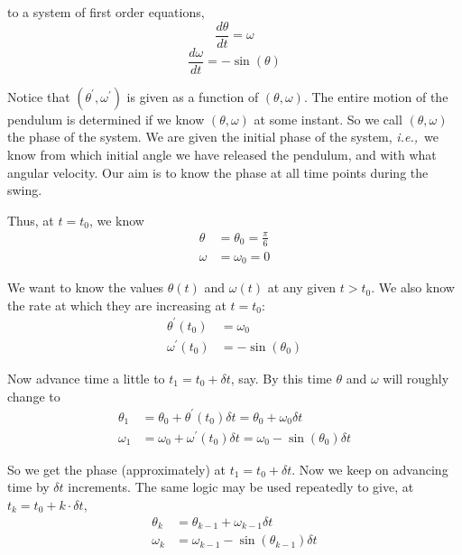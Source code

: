\documentclass[a4paper,11pt]{report}
\begin{document}
\begin{enumerate}
    to a system of first order equations,
    \begin{equation*}
    \frac{d \theta}{dt} = \omega
    \end{equation*}
    \begin{equation*}
    \frac{d \omega}{dt} = -\sin(\theta)
    \end{equation*}

    Notice that $(\theta^\prime, \omega^\prime)$ is given as a function of $(\theta,
    \omega)$. The entire motion of the pendulum is determined if we know $(\theta,
    \omega)$ at some instant. So we call $(\theta, \omega)$ the phase of the system. We
    are given the initial phase of the system, \textit{i.e.,}\ we know from which initial
    angle we have released the pendulum, and with what angular velocity. Our aim is to 
    know the phase at all time points during the swing.

    Thus, at $t = t_0$, we know
    \begin{equation*}
    \begin{aligned}
    \theta &= \theta_0 = \frac{\pi}{6} \\
    \omega &= \omega_0 = 0
    \end{aligned}
    \end{equation*}

    We want to know the values $\theta(t)$ and $\omega(t)$ at any given $t > t_0$. We 
    also know the rate at which they are increasing at $t = t_0$:
    \begin{equation*}
    \begin{aligned}
    \theta^{\prime}(t_0) &= \omega_0 \\
    \omega^{\prime}(t_0) &= - \sin(\theta_0)
    \end{aligned}
    \end{equation*}

    Now advance time a little to $t_1 = t_0 + \delta t$, say. By this time $\theta$ and
    $\omega$ will roughly change to
    \begin{equation*}
    \begin{aligned}
    \theta_1 &= \theta_0 + \theta^{\prime}(t_0) \delta t = \theta_0 + \omega_0 \delta t \\
    \omega_1 &= \omega_0 + \omega^{\prime}(t_0) \delta t = \omega_0 - \sin(\theta_0) \delta t
    \end{aligned}
    \end{equation*}

    So we get the phase (approximately) at $t_1 = t_0 + \delta t$. Now we keep on
    advancing time by $\delta t$ increments. The same logic may be used repeatedly to 
    give, at $t_k = t_0 + k \cdot \delta t$,
    \begin{equation*}
    \begin{aligned}
    \theta_k &= \theta_{k-1} + \omega_{k-1} \delta t \\
    \omega_k &= \omega_{k-1} - \sin(\theta_{k-1}) \delta t
    \end{aligned}
    \end{equation*}


\end{enumerate}
\end{document}
